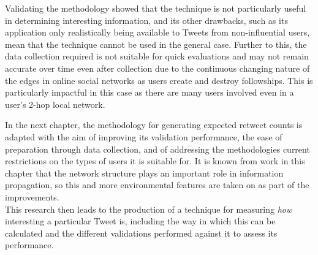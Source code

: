 Validating the methodology showed that the technique is not particularly useful in determining interesting information, and its other drawbacks, such as its application only realistically being available to Tweets from non-influential users, mean that the technique cannot be used in the general case. Further to this, the data collection required is not suitable for quick evaluations and may not remain accurate over time even after collection due to the continuous changing nature of the edges in online social networks as users create and destroy followships. This is particularly impactful in this case as there are many users involved even in a user's 2-hop local network.

In the next chapter, the methodology for generating expected retweet counts is adapted with the aim of improving its validation performance, the ease of preparation through data collection, and of addressing the methodologies current restrictions on the types of users it is suitable for. It is known from work in this chapter that the network structure plays an important role in information propagation, so this and more environmental features are taken on as part of the improvements.\\
This research then leads to the production of a technique for measuring \textit{how} interesting a particular Tweet is, including the way in which this can be calculated and the different validations performed against it to assess its performance.
